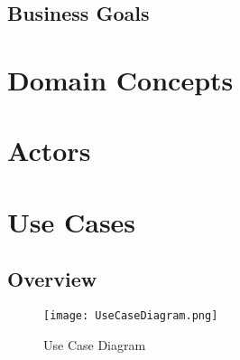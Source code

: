 \documentclass[11pt]{article}
\newcounter{use case ID}
\begin{document}
\subsection{Business Goals}

\section{Domain Concepts}




\clearpage
\section{Actors}

\section{Use Cases}

\subsection{Overview}

\begin{figure}[htbp]
\texttt{[image: UseCaseDiagram.png]}
\caption{Use Case Diagram}
\label{fig:use-case-diagram}
\end{figure}
\end{document}
